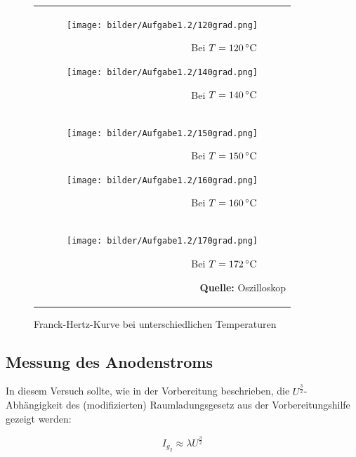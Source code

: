 \documentclass[a4paper,titlepage]{scrartcl}
\numberwithin{equation}{section}
\begin{document}
\begin{figure}[H]
	\centering
	\begin{tabular}{@{}r@{}}
	    \begin{subfigure}[b]{0.48\textwidth}
	    	\centering
			\texttt{[image: bilder/Aufgabe1.2/120grad.png]}
			\caption{Bei $T = \unit[120]{^{\circ}C}$}
			\label{fig:airInductor300}
		\end{subfigure}
		
	    \begin{subfigure}[b]{0.48\textwidth}
	    	\centering
			\texttt{[image: bilder/Aufgabe1.2/140grad.png]}
			\caption{Bei $T = \unit[140]{^{\circ}C}$}
			\label{fig:airInductor30}
		\end{subfigure}\\
		
	    \begin{subfigure}[b]{0.48\textwidth}
	    	\centering
			\texttt{[image: bilder/Aufgabe1.2/150grad.png]}
			\caption{Bei $T = \unit[150]{^{\circ}C}$}
			\label{fig:airInductor30}
		\end{subfigure}
		
	    \begin{subfigure}[b]{0.48\textwidth}
	    	\centering
			\texttt{[image: bilder/Aufgabe1.2/160grad.png]}
			\caption{Bei $T = \unit[160]{^{\circ}C}$}
			\label{fig:airInductor30}
		\end{subfigure}\\
		
	    \begin{subfigure}[b]{0.48\textwidth}
	    	\centering
			\texttt{[image: bilder/Aufgabe1.2/170grad.png]}
			\caption{Bei $T = \unit[172]{^{\circ}C}$}
			\label{fig:airInductor30}
		\end{subfigure}
		\footnotesize\sffamily\textbf{Quelle:} Oszilloskop
	\end{tabular}
    \caption{Franck-Hertz-Kurve bei unterschiedlichen Temperaturen}
    \label{fig:franckHertzCurve}
\end{figure}

\subsection{Messung des Anodenstroms}
In diesem Versuch sollte, wie in der Vorbereitung beschrieben, die $U^{\frac{3}{2}}$-Abhängigkeit des (modifizierten) Raumladungsgesetz aus der Vorbereitungshilfe gezeigt werden:

\begin{equation*}
I_{g_2} \approx \lambda U^{\frac{3}{2}}
\end{equation*}
\end{document}
